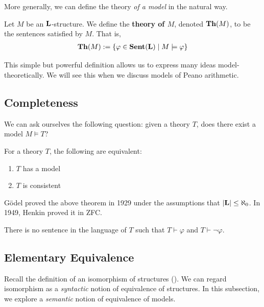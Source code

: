 More generally, we can define the theory \textit{of a model} in the natural way.

\begin{boxdefinition}\label{Ch1:Def:Thy_of_Model}
    Let $M$ be an $\mathbf{L}$-structure. We define the \textbf{theory of $M$}, denoted $\mathbf{Th}(M)$, to be the sentences satisfied by $M$. That is,
    \begin{align*}
        \mathbf{Th}(M) := \left\{ \varphi \in \mathbf{Sent}\!\left( \mathbf{L} \right) \; \middle\vert \; M \models \varphi \right\}
    \end{align*}
\end{boxdefinition}

This simple but powerful definition allows us to express many ideas model-theoretically. We will see this when we discuss models of Peano arithmetic.

\subsection{Completeness}

We can ask ourselves the following question: given a theory $T$, does there exist a model $M \models T$?

\begin{boxtheorem}[Completeness]
    For a theory $T$, the following are equivalent:
    \begin{enumerate}
        \item $T$ has a model
        \item $T$ is consistent
    \end{enumerate}
\end{boxtheorem}

Gödel proved the above theorem in 1929 under the assumptions that $\left\lvert \mathbf{L} \right\rvert \leq \aleph_0$. In 1949, Henkin proved it in ZFC.

\begin{boxdefinition}[Consistency]
    There is no sentence in the language of $T$ such that $T \vdash \varphi$ and $T \vdash \neg\varphi$.
\end{boxdefinition}

\subsection{Elementary Equivalence}

Recall the definition of an isomorphism of structures (). We can regard isomorphism as a \textit{syntactic} notion of equivalence of structures. In this subsection, we explore a \textit{semantic} notion of equivalence of models.


